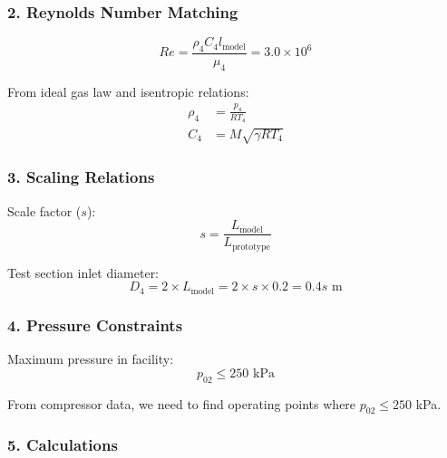 \documentclass[12pt]{article}
\begin{document}
\subsubsection*{2. Reynolds Number Matching}
\begin{equation}
    Re = \frac{\rho_4 C_4 l_{\text{model}}}{\mu_4} = 3.0 \times 10^6
\end{equation}

From ideal gas law and isentropic relations:
\begin{align}
    \rho_4 &= \frac{p_4}{RT_4} \\
    C_4 &= M\sqrt{\gamma R T_4}
\end{align}

\subsubsection*{3. Scaling Relations}
Scale factor ($s$):
\begin{equation}
    s = \frac{L_{\text{model}}}{L_{\text{prototype}}}
\end{equation}

Test section inlet diameter:
\begin{equation}
    D_4 = 2 \times L_{\text{model}} = 2 \times s \times 0.2 = 0.4s \text{ m}
\end{equation}

\subsubsection*{4. Pressure Constraints}
Maximum pressure in facility:
\begin{equation}
    p_{02} \leq 250 \text{ kPa}
\end{equation}

From compressor data, we need to find operating points where $p_{02} \leq 250$ kPa.

\subsubsection*{5. Calculations}
\end{document}

